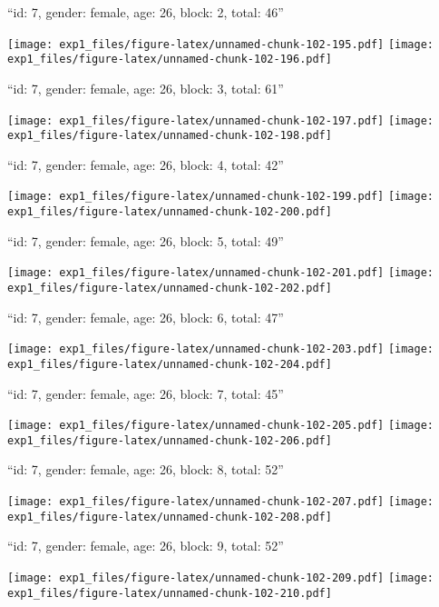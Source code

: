\documentclass[11pt,,]{article}
\begin{document}
\newpage
[1] 

``id: 7, gender: female, age: 26, block: 2, total: 46''

\texttt{[image: exp1\_files/figure-latex/unnamed-chunk-102-195.pdf]}
\texttt{[image: exp1\_files/figure-latex/unnamed-chunk-102-196.pdf]}

\newpage
[1] 

``id: 7, gender: female, age: 26, block: 3, total: 61''

\texttt{[image: exp1\_files/figure-latex/unnamed-chunk-102-197.pdf]}
\texttt{[image: exp1\_files/figure-latex/unnamed-chunk-102-198.pdf]}

\newpage
[1] 

``id: 7, gender: female, age: 26, block: 4, total: 42''

\texttt{[image: exp1\_files/figure-latex/unnamed-chunk-102-199.pdf]}
\texttt{[image: exp1\_files/figure-latex/unnamed-chunk-102-200.pdf]}

\newpage
[1] 

``id: 7, gender: female, age: 26, block: 5, total: 49''

\texttt{[image: exp1\_files/figure-latex/unnamed-chunk-102-201.pdf]}
\texttt{[image: exp1\_files/figure-latex/unnamed-chunk-102-202.pdf]}

\newpage
[1] 

``id: 7, gender: female, age: 26, block: 6, total: 47''

\texttt{[image: exp1\_files/figure-latex/unnamed-chunk-102-203.pdf]}
\texttt{[image: exp1\_files/figure-latex/unnamed-chunk-102-204.pdf]}

\newpage
[1] 

``id: 7, gender: female, age: 26, block: 7, total: 45''

\texttt{[image: exp1\_files/figure-latex/unnamed-chunk-102-205.pdf]}
\texttt{[image: exp1\_files/figure-latex/unnamed-chunk-102-206.pdf]}

\newpage
[1] 

``id: 7, gender: female, age: 26, block: 8, total: 52''

\texttt{[image: exp1\_files/figure-latex/unnamed-chunk-102-207.pdf]}
\texttt{[image: exp1\_files/figure-latex/unnamed-chunk-102-208.pdf]}

\newpage
[1] 

``id: 7, gender: female, age: 26, block: 9, total: 52''

\texttt{[image: exp1\_files/figure-latex/unnamed-chunk-102-209.pdf]}
\texttt{[image: exp1\_files/figure-latex/unnamed-chunk-102-210.pdf]}
\end{document}

